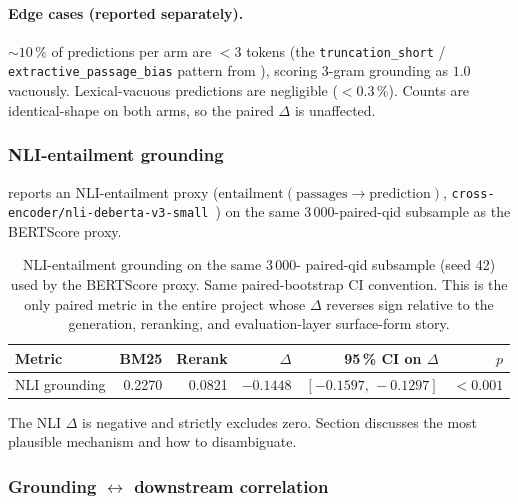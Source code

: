 \documentclass[11pt,a4paper]{article}
\newcommand{\bertscore}{BERTScore}
\newcommand{\bmtwofive}{BM25}
\newcommand{\code}[1]{\texttt{#1}}
\begin{document}
\paragraph{Edge cases (reported separately).}  $\sim\!10\,\%$ of
predictions per arm are $<\!3$ tokens (the \texttt{truncation\_short}
/ \texttt{extractive\_passage\_bias} pattern from
), scoring 3-gram grounding as $1.0$
vacuously.  Lexical-vacuous predictions are negligible
($<\!0.3\,\%$).  Counts are identical-shape on both arms, so the
paired $\Delta$ is unaffected.

\subsubsection{NLI-entailment grounding}
\label{sec:w7-nli}

 reports an NLI-entailment proxy
($\text{entailment}(\text{passages} \to \text{prediction})$,
\code{cross-\allowbreak encoder/\allowbreak nli-\allowbreak deberta-v3-small}~\cite{he2023debertav3,williams2018mnli})
on the same 3\,000-paired-qid subsample as the \bertscore{}
proxy.

\begin{table}[H]
  \centering
  \caption{NLI-entailment grounding on the same 3\,000-
  paired-qid subsample (seed 42) used by the \bertscore{} proxy.
  Same paired-bootstrap CI convention.  This is the only paired
  metric in the entire project whose $\Delta$ reverses sign relative
  to the generation, reranking, and evaluation-layer surface-form story.}
  \label{tab:w7-nli}
  \begin{tabular}{lrrrrr}
    \toprule
    Metric    & \bmtwofive{} & Rerank & $\Delta$ & 95\,\% CI on $\Delta$ & $p$ \\
    \midrule
    NLI grounding & 0.2270   & 0.0821 & $\mathbf{-0.1448}$ & $[-0.1597,\,-0.1297]$ & $<\!0.001$ \\
    \bottomrule
  \end{tabular}
\end{table}

The NLI $\Delta$ is negative and strictly excludes zero.  Section
 discusses the most plausible
mechanism and how to disambiguate.

\subsubsection{Grounding $\leftrightarrow$ downstream
correlation}
\end{document}
